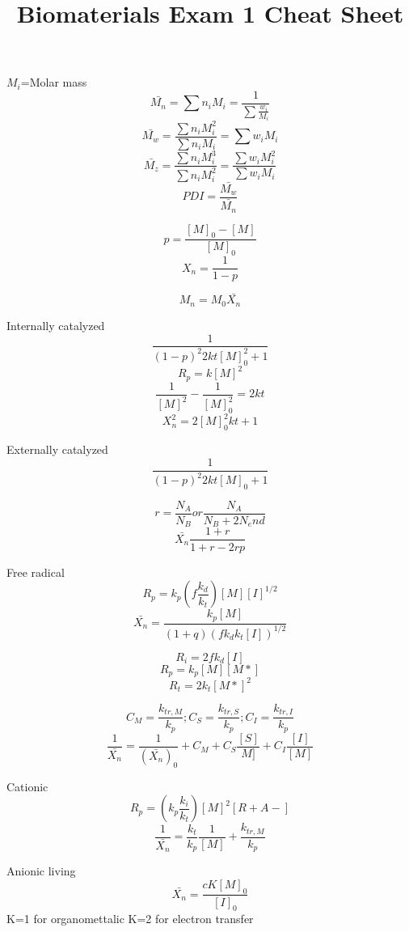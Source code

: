 \documentclass{article}
\title{Biomaterials Exam 1 Cheat Sheet}
\begin{document}
\maketitle
$M_i$=Molar mass
$$\bar{M_n}=\sum n_iM_i=\frac{1}{\sum \frac{w_i}{M_i}}$$
$$\bar{M_w}=\frac{\sum n_iM_i^2}{\sum n_iM_i}=\sum w_iM_i$$
$$\bar{M_z}=\frac{\sum n_iM_i^3}{\sum n_iM_i^2}=\frac{\sum w_iM_i^2}{\sum w_iM_i}$$
$$PDI=\frac{\bar{M_w}}{\bar{M_n}}$$

$$p=\frac{[M]_0-[M]}{[M]_0}$$
$$X_n=\frac{1}{1-p}$$

$$M_n=M_0\bar{X_n}$$

Internally catalyzed
$$\frac{1}{(1-p)^2	2kt[M]_0^2+1}$$
$$R_p=k[M]^2$$
$$\frac{1}{[M]^2}-\frac{1}{[M]_0^2}=2kt$$
$$X_n^2=2[M]_0^2kt+1$$

Externally catalyzed
$$\frac{1}{(1-p)^2	2kt[M]_0+1}$$

$$r=\frac{N_A}{N_B} or \frac{N_A}{N_B+2N_end}$$
$$\bar{X_n}\frac{1+r}{1+r-2rp}$$

Free radical
$$R_p=k_p\left(f\frac{k_d}{k_t}\right)[M][I]^{1/2}$$
$$\bar{X_n}=\frac{k_p[M]}{(1+q)(fk_dk_t[I])^{1/2}}$$

$$R_i=2fk_d[I]$$
$$R_p=k_p[M][M*]$$
$$R_t=2k_t[M*]^2$$

$$C_M=\frac{k_{tr,M}}{k_p};C_S=\frac{k_{tr,S}}{k_p};C_I=\frac{k_{tr,I}}{k_p}$$
$$\frac{1}{\bar{X_n}}=\frac{1}{(\bar{X_n})_0}+C_M+C_S\frac{[S]}{M]}+C_I\frac{[I]}{[M]}$$

Cationic
$$R_p=\left(k_p\frac{k_i}{k_t}\right)[M]^2[R+A-]$$
$$\frac{1}{\bar{X_n}}=\frac{k_t}{k_p}\frac{1}{[M]}+\frac{k_{tr,M}}{k_p}$$

Anionic living
$$\bar{X_n}=\frac{cK[M]_0}{[I]_0}$$
K=1 for organomettalic
K=2 for electron transfer
\end{document}
